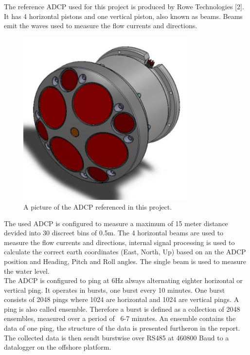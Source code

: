 The reference ADCP used for this project is produced by Rowe Technologies [2]. It has 4 horizontal pistons and one vertical piston, also known as beams. Beams emit the waves used to measure the flow currents and directions.\\
\begin{figure}[h]
\centering
      \includegraphics[width=0.8\textwidth]{adcp}
        \caption{A picture of the ADCP referenced in this project. }
\end{figure}
The used ADCP is configured to measure a maximum of 15 meter distance devided into 30 discreet bins of 0.5m. The 4 horizontal beams are used to measure the flow currents and directions, internal signal processing is used to calculate the correct earth coordinates (East, North, Up) based on an the ADCP position and Heading, Pitch and Roll angles. The single beam is used to measure the water level.\\
The ADCP is configured to ping at 6Hz always alternating eighter horizontal or vertical ping. It operates in bursts, one burst every 10 minutes. One burst consists of 2048 pings where 1024 are horizontal and 1024 are vertical pings. A ping is also called ensemble. Therefore a burst is defined as a collection of 2048 ensembles, measured over a period of ~6-7 minutes. An ensemble contains the data of one ping, the structure of the data is presented furtheron in the report. The collected data is then sendt burstwise over RS485 at 460800 Baud to a datalogger on the offshore platform.

